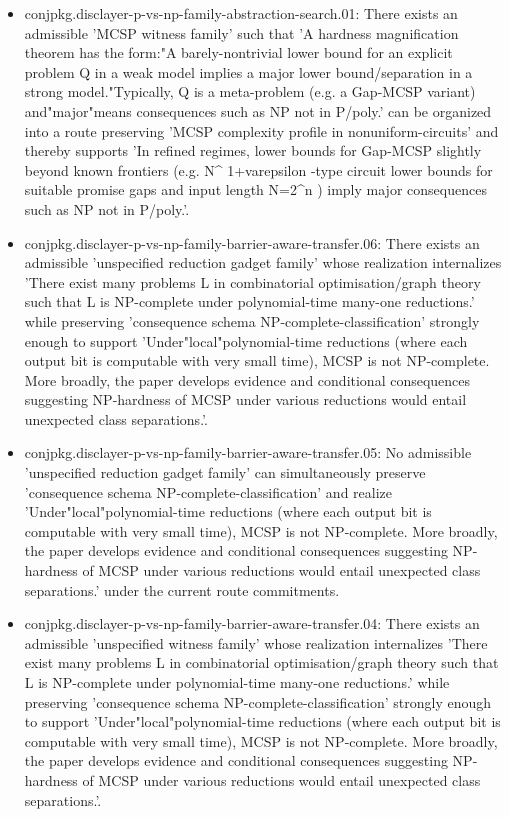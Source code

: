 \documentclass[11pt]{article}
\begin{document}
\begin{itemize}
\item conjpkg.disclayer-p-vs-np-family-abstraction-search.01: There exists an admissible 'MCSP witness family' such that 'A hardness magnification theorem has the form:"A barely-nontrivial lower bound for an explicit problem Q in a weak model implies a major lower bound/separation in a strong model."Typically, Q is a meta-problem (e.g. a Gap-MCSP variant) and"major"means consequences such as NP not in P/poly.' can be organized into a route preserving 'MCSP complexity profile in nonuniform-circuits' and thereby supports 'In refined regimes, lower bounds for Gap-MCSP slightly beyond known frontiers (e.g. N\textasciicircum{} 1+varepsilon -type circuit lower bounds for suitable promise gaps and input length N=2\textasciicircum{}n ) imply major consequences such as NP not in P/poly.'.
\item conjpkg.disclayer-p-vs-np-family-barrier-aware-transfer.06: There exists an admissible 'unspecified reduction gadget family' whose realization internalizes 'There exist many problems L in combinatorial optimisation/graph theory such that L is NP-complete under polynomial-time many-one reductions.' while preserving 'consequence schema NP-complete-classification' strongly enough to support 'Under"local"polynomial-time reductions (where each output bit is computable with very small time), MCSP is not NP-complete. More broadly, the paper develops evidence and conditional consequences suggesting NP-hardness of MCSP under various reductions would entail unexpected class separations.'.
\item conjpkg.disclayer-p-vs-np-family-barrier-aware-transfer.05: No admissible 'unspecified reduction gadget family' can simultaneously preserve 'consequence schema NP-complete-classification' and realize 'Under"local"polynomial-time reductions (where each output bit is computable with very small time), MCSP is not NP-complete. More broadly, the paper develops evidence and conditional consequences suggesting NP-hardness of MCSP under various reductions would entail unexpected class separations.' under the current route commitments.
\item conjpkg.disclayer-p-vs-np-family-barrier-aware-transfer.04: There exists an admissible 'unspecified witness family' whose realization internalizes 'There exist many problems L in combinatorial optimisation/graph theory such that L is NP-complete under polynomial-time many-one reductions.' while preserving 'consequence schema NP-complete-classification' strongly enough to support 'Under"local"polynomial-time reductions (where each output bit is computable with very small time), MCSP is not NP-complete. More broadly, the paper develops evidence and conditional consequences suggesting NP-hardness of MCSP under various reductions would entail unexpected class separations.'.

\end{itemize}
\end{document}
